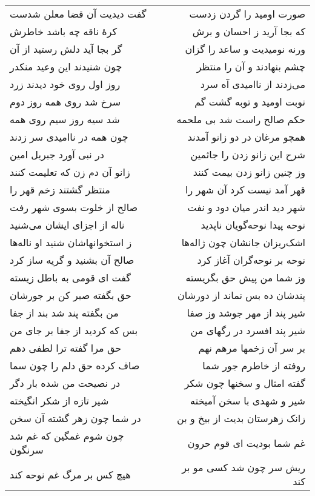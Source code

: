 \begin{center}
\begin{longtable}{l p{0.5cm} r}
\\
گفت دیدیت آن قضا معلن شدست
&&
صورت اومید را گردن زدست
\\
کرهٔ ناقه چه باشد خاطرش
&&
که بجا آرید ز احسان و برش
\\
گر بجا آید دلش رستید از آن
&&
ورنه نومیدیت و ساعد را گزان
\\
چون شنیدند این وعید منکدر
&&
چشم بنهادند و آن را منتظر
\\
روز اول روی خود دیدند زرد
&&
می‌زدند از ناامیدی آه سرد
\\
سرخ شد روی همه روز دوم
&&
نوبت اومید و توبه گشت گم
\\
شد سیه روز سیم روی همه
&&
حکم صالح راست شد بی ملحمه
\\
چون همه در ناامیدی سر زدند
&&
همچو مرغان در دو زانو آمدند
\\
در نبی آورد جبریل امین
&&
شرح این زانو زدن را جاثمین
\\
زانو آن دم زن که تعلیمت کنند
&&
وز چنین زانو زدن بیمت کنند
\\
منتظر گشتند زخم قهر را
&&
قهر آمد نیست کرد آن شهر را
\\
صالح از خلوت بسوی شهر رفت
&&
شهر دید اندر میان دود و نفت
\\
ناله از اجزای ایشان می‌شنید
&&
نوحه پیدا نوحه‌گویان ناپدید
\\
ز استخوانهاشان شنید او ناله‌ها
&&
اشک‌ریزان جانشان چون ژاله‌ها
\\
صالح آن بشنید و گریه ساز کرد
&&
نوحه بر نوحه‌گران آغاز کرد
\\
گفت ای قومی به باطل زیسته
&&
وز شما من پیش حق بگریسته
\\
حق بگفته صبر کن بر جورشان
&&
پندشان ده بس نماند از دورشان
\\
من بگفته پند شد بند از جفا
&&
شیر پند از مهر جوشد وز صفا
\\
بس که کردید از جفا بر جای من
&&
شیر پند افسرد در رگهای من
\\
حق مرا گفته ترا لطفی دهم
&&
بر سر آن زخمها مرهم نهم
\\
صاف کرده حق دلم را چون سما
&&
روفته از خاطرم جور شما
\\
در نصیحت من شده بار دگر
&&
گفته امثال و سخنها چون شکر
\\
شیر تازه از شکر انگیخته
&&
شیر و شهدی با سخن آمیخته
\\
در شما چون زهر گشته آن سخن
&&
زانک زهرستان بدیت از بیخ و بن
\\
چون شوم غمگین که غم شد سرنگون
&&
غم شما بودیت ای قوم حرون
\\
هیچ کس بر مرگ غم نوحه کند
&&
ریش سر چون شد کسی مو بر کند
\\

\end{longtable}
\end{center}
